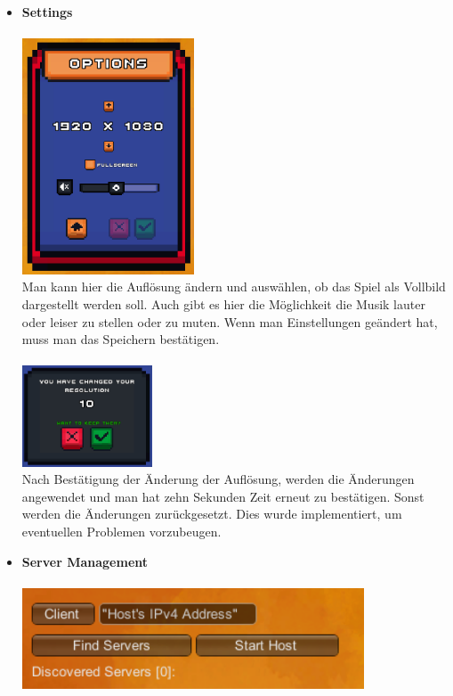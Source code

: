 \begin{itemize}
\begin {itemize}
            Es gibt die Möglichkeit die Credits vorzeitig zu verlassen. Dies geschieht durch das Drücken des Hausbuttons. Die Tester fanden dies auch sehr intuitiv.
        \item \textbf{Settings}\\
            \\
            \includegraphics*[height=7cm]{resources/setting.png}\\
            Man kann hier die Auflösung ändern und auswählen, ob das Spiel als Vollbild dargestellt werden soll. Auch gibt es hier die Möglichkeit die Musik lauter oder leiser zu stellen
            oder zu muten. Wenn man Einstellungen geändert hat, muss man das Speichern bestätigen. \\
            \\
            \includegraphics*[height=3cm]{resources/resolution.png}\\
            Nach Bestätigung der Änderung der Auflösung, werden die Änderungen angewendet und man hat zehn Sekunden Zeit erneut zu bestätigen. Sonst werden die Änderungen zurückgesetzt.
            Dies wurde implementiert, um eventuellen Problemen vorzubeugen. 
        \item \textbf{Server Management}\\
            \\
            \includegraphics*[height = 3cm]{resources/server.png}\\

\end{itemize}
\end{itemize}
